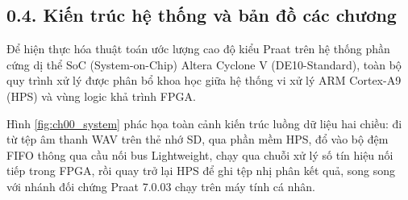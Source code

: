 \subsection*{0.4. Kiến trúc hệ thống và bản đồ các chương}

Để hiện thực hóa thuật toán ước lượng cao độ kiểu Praat trên hệ thống phần cứng dị thể SoC (System-on-Chip) Altera Cyclone V (DE10-Standard), toàn bộ quy trình xử lý được phân bổ khoa học giữa hệ thống vi xử lý ARM Cortex-A9 (HPS) và vùng logic khả trình FPGA. 

Hình \ref{fig:ch00_system} phác họa toàn cảnh kiến trúc luồng dữ liệu hai chiều: đi từ tệp âm thanh WAV trên thẻ nhớ SD, qua phần mềm HPS, đổ vào bộ đệm FIFO thông qua cầu nối bus Lightweight, chạy qua chuỗi xử lý số tín hiệu nối tiếp trong FPGA, rồi quay trở lại HPS để ghi tệp nhị phân kết quả, song song với nhánh đối chứng Praat 7.0.03 chạy trên máy tính cá nhân.



